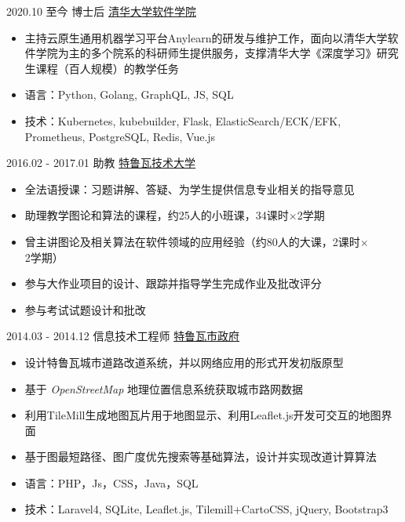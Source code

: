 \documentclass[letterpaper]{twentysecondcv} %
\begin{document}
\begin{twentyfluid}

\twentyitemfluid
    {2020.10 至今}
    {博士后}
    {\href{https://www.thss.tsinghua.edu.cn/index.htm}{清华大学软件学院}}
    {\\   }
    {
    {
    \vspace{-0.2cm}
    \begin{itemize}
        \item 主持云原生通用机器学习平台Anylearn的研发与维护工作，面向以清华大学软件学院为主的多个院系的科研师生提供服务，支撑清华大学《深度学习》研究生课程（百人规模）的教学任务
        \item 语言：Python, Golang, GraphQL, JS, SQL
        \item 技术：Kubernetes, kubebuilder, Flask, ElasticSearch/ECK/EFK, Prometheus, PostgreSQL, Redis, Vue.js
    \end{itemize}
    }
    }

\twentyitemfluid
    	{2016.02 - 2017.01}
        {助教}
        {\href{http://www.utt.fr/}{特鲁瓦技术大学}}
        {\\  }
        {
        {
        \vspace{-0.2cm}
        \begin{itemize}
            \item 全法语授课：习题讲解、答疑、为学生提供信息专业相关的指导意见
        	\item 助理教学图论和算法的课程，约25人的小班课，34课时$\times$2学期
        	\item 曾主讲图论及相关算法在软件领域的应用经验（约80人的大课，2课时$\times$2学期）
        	\item 参与大作业项目的设计、跟踪并指导学生完成作业及批改评分
        	\item 参与考试试题设计和批改
        \end{itemize}
        }
        }

\twentyitemfluid
        {2014.03 - 2014.12}
        {信息技术工程师}
        {\href{https://www.ville-troyes.fr/}{特鲁瓦市政府}}
        {\\   }
        {
        {
        \vspace{-0.2cm}
        \begin{itemize}
            \item 设计特鲁瓦城市道路改道系统，并以网络应用的形式开发初版原型
            \item 基于 \textit{OpenStreetMap} 地理位置信息系统获取城市路网数据
            \item 利用TileMill生成地图瓦片用于地图显示、利用Leaflet.js开发可交互的地图界面
            \item 基于图最短路径、图广度优先搜索等基础算法，设计并实现改道计算算法
            \item 语言：PHP，Js，CSS，Java，SQL
            \item 技术：Laravel4, SQLite, Leaflet.js, Tilemill+CartoCSS, jQuery, Bootstrap3
        \end{itemize}
        }
        }


\end{twentyfluid}
\end{document}
